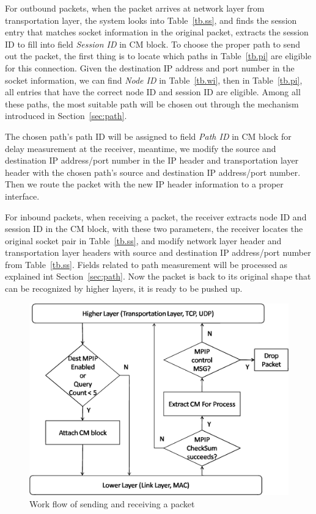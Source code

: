 For outbound packets, when the packet arrives at network layer from transportation layer, the system looks into Table~\ref{tb.ss}, and finds the session entry that matches socket information in the original packet, extracts the session ID to fill into field \emph{Session ID} in CM block. To choose the proper path to send out the packet, the first thing is to locate which paths in Table~\ref{tb.pi} are eligible for this connection. Given the destination IP address and port number in the socket information, we can find \emph{Node ID} in Table~\ref{tb.wi}, then in Table~\ref{tb.pi}, all entries that have the correct node ID and session ID are eligible. Among all these paths, the most suitable path will be chosen out through the mechanism introduced in Section~\ref{sec:path}.

The chosen path's path ID will be assigned to field \emph{Path ID} in CM block for delay measurement at the receiver, meantime, we modify the source and destination IP address/port number in the IP header and transportation layer header with the chosen path's source and destination IP address/port number. Then we route the packet with the new IP header information to a proper interface.

For inbound packets, when receiving a packet, the receiver extracts node ID and session ID in the CM block, with these two parameters, the receiver locates the original socket pair in Table~\ref{tb.ss}, and modify network layer header and transportation layer headers with source and destination IP address/port number from Table~\ref{tb.ss}. Fields related to path measurement will be processed as explained int Section~\ref{sec:path}. Now the packet is back to its original shape that can be recognized by higher layers, it is ready to be pushed up.


\begin{figure}
\centering
\includegraphics[width=1\linewidth]{fig/workflow.eps}
\caption{Work flow of sending and receiving a packet}
\label{fig.workflow}
\end{figure}

